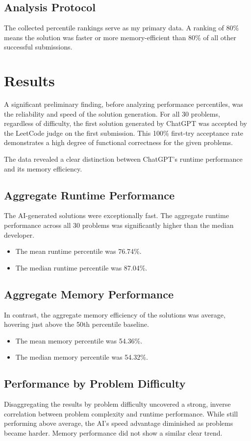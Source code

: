 \documentclass[12pt, a4paper]{article}
\begin{document}
\subsection{Analysis Protocol}
The collected percentile rankings serve as my primary data. A ranking of 80\% means the solution was faster or more memory-efficient than 80\% of all other successful submissions.

\section{Results}

A significant preliminary finding, before analyzing performance percentiles, was the reliability and speed of the solution generation. For all 30 problems, regardless of difficulty, the first solution generated by ChatGPT was accepted by the LeetCode judge on the first submission. This 100\% first-try acceptance rate demonstrates a high degree of functional correctness for the given problems.

The data revealed a clear distinction between ChatGPT's runtime performance and its memory efficiency.

\subsection{Aggregate Runtime Performance}
The AI-generated solutions were exceptionally fast. The aggregate runtime performance across all 30 problems was significantly higher than the median developer.
\begin{itemize}
    \item The mean runtime percentile was 76.74\%.
    \item The median runtime percentile was 87.04\%.
\end{itemize}

\subsection{Aggregate Memory Performance}
In contrast, the aggregate memory efficiency of the solutions was average, hovering just above the 50th percentile baseline.
\begin{itemize}
    \item The mean memory percentile was 54.36\%.
    \item The median memory percentile was 54.32\%.
\end{itemize}

\subsection{Performance by Problem Difficulty}
Disaggregating the results by problem difficulty uncovered a strong, inverse correlation between problem complexity and runtime performance. While still performing above average, the AI's speed advantage diminished as problems became harder. Memory performance did not show a similar clear trend.
\end{document}
